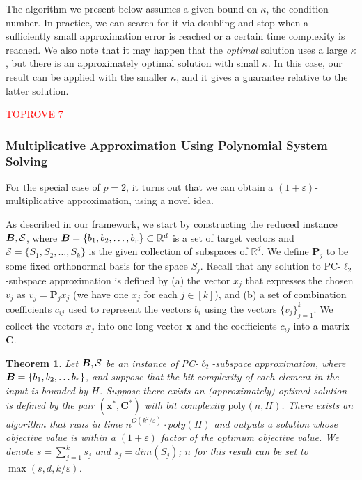 \documentclass[11pt]{article}
\makeatletter
\theoremstyle{plain}
\newtheorem{theorem}{Theorem}[section]
\theoremstyle{plain}
\theoremstyle{definition}
\theoremstyle{plain}
\theoremstyle{remark}
\newenvironment{proof}[1][\protect\proofname]{\par
	\normalfont\topsep6\p@\@plus6\p@\relax
	\trivlist
	\itemindent\parindent
	\item[\hskip\labelsep\scshape #1]\ignorespaces
}{\endtrivlist\@endpefalse
}
\providecommand{\proofname}{Proof}
\newcommand{\RR}{\mathbb{R}}
\newcommand{\cS}{\mathcal{S}}
\newcommand{\eps}{\varepsilon}
\DeclareRobustCommand{\fairSAp}[1]{PC-$\ell_{#1}$-subspace approximation}
\makeatother
\begin{document}
The algorithm we present below assumes a given bound on $\kappa$, the condition number. In practice, we can search for it via doubling and stop when a sufficiently small approximation error is reached or a certain time complexity is reached. We also note that it may happen that the \emph{optimal} solution uses a large $\kappa$, but there is an approximately optimal solution with small $\kappa$. In this case, our result can be applied with the smaller $\kappa$, and it gives a guarantee relative to the latter solution.

\begin{proof}\textcolor{red}{TOPROVE 7}\end{proof}

\subsubsection{Multiplicative Approximation Using Polynomial System Solving}\label{sec:fairsa-mult}
For the special case of $p=2$, it turns out that we can obtain a $(1+\eps)$-multiplicative approximation, using a novel idea.  

As described in our framework, we start by constructing  the reduced instance $\bfB, \cS$, where $\bfB = \{b_1, b_2, \dots, b_r\} \subset \RR^d$ is a set of target vectors and $\cS = \{ S_1, S_2,  \dots, S_k\}$ is the given collection of subspaces of $\RR^d$. We define $\bm{P}_j$ to be some fixed orthonormal basis for the space $S_j$. Recall that any solution to \fairSAp{2} is defined by (a) the vector $x_j$ that expresses the chosen $v_j$ as $v_j = \bm{P}_j x_j$ (we have one $x_j$ for each $j \in [k]$), and (b) a set of combination coefficients $c_{ij}$ used to represent the vectors $b_i$ using the vectors $\{v_j\}_{j=1}^k$. We collect the vectors $x_j$ into one long vector $\bm{x}$ and the coefficients $c_{ij}$ into a matrix $\bm{C}$. 

\begin{theorem}\label{thm:multiplicative}
Let $\bfB, \cS$ be an instance of \fairSAp{2}, where $\bm{B} = \{b_1, b_2, \dots b_r\}$, and suppose that the bit complexity of each element in the input is bounded by $H$. Suppose there exists an (approximately) optimal solution is defined by the pair $(\bm{x}^*, \bm{C}^*)$ with bit complexity $\text{poly}(n, H)$.  There exists an algorithm that runs in time $n^{O(k^2/\varepsilon)}\cdot poly(H)$ and outputs a solution whose objective value is within a $(1+\eps)$ factor of the optimum objective value. We denote $s=\sum_{j=1}^k s_j$ and $s_j =dim(S_j)$; $n$ for this result can be set to $\max(s,d,  k/\eps)$. 
\end{theorem}
\end{document}
